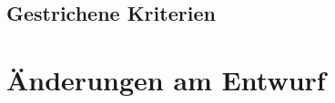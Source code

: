 \documentclass[11pt, usepdftitle=false,...]{beamer}
\begin{document}
			
			
			
	
		\subsection{Gestrichene Kriterien}
%		
			
	\section{Änderungen am Entwurf}	
	\frame{\sectionpage}
	
\end{document}
